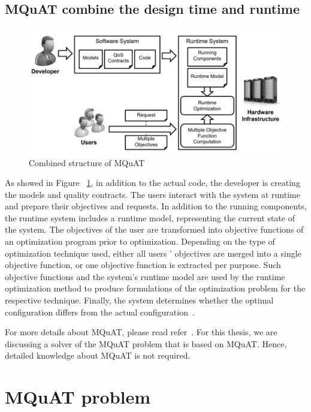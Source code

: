 \subsection{MQuAT combine the design time and runtime}
\begin{figure}
	\centering
	\includegraphics[width=\textwidth]{images/CombinedMQuAT}
	\caption[Combined structure of MQuAT]{Combined structure of MQuAT}
	\label{fig:CombinedMQuAT}
\end{figure}
As showed in Figure ~\ref{fig:CombinedMQuAT}, in addition to the actual code, the developer is creating the models and quality contracts. The users interact with the system at runtime and prepare their objectives and requests. 
In addition to the running components, the runtime system includes a runtime model, representing the current state of the system. The objectives of the user are transformed into objective functions of an optimization program prior to optimization. Depending on the type of optimization technique used, either all users ' objectives are merged into a single objective function, or one objective function is extracted per purpose. Such objective functions and the system's runtime model are used by the runtime optimization method to produce formulations of the optimization problem for the respective technique. Finally, the system determines whether the optimal configuration differs from the actual configuration~\cite{gotz13, ahmad18}.

For more details about MQuAT, please read refer~\cite{gotz13}. For this thesis, we are discussing a solver of the MQuAT problem that is based on MQuAT. Hence, detailed knowledge about MQuAT is not required. 


\section{MQuAT problem}

